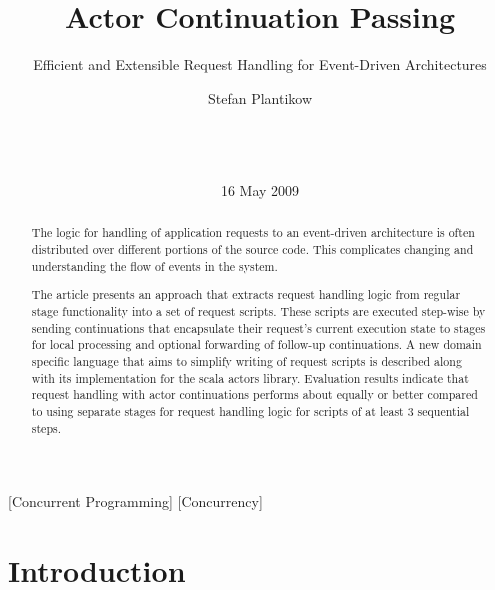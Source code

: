 \documentclass{sig-alternate}
\begin{document}

\title{Actor Continuation Passing}
\subtitle{Efficient and Extensible Request Handling for Event-Driven Architectures}


\author{
\alignauthor
Stefan Plantikow\\
       \\
       \\
       \\
}

\date{16 May 2009}


\maketitle

\begin{abstract}
The logic for handling of application requests to an event-driven architecture is often distributed
over different portions of the source code. This complicates changing and understanding the flow
of events in the system.

The article presents an approach that extracts request handling logic from regular stage
functionality into a set of request scripts. These scripts are executed step-wise by sending
continuations that encapsulate their request's current execution state to stages for local
processing and optional forwarding of follow-up continuations. A new domain specific language that
aims to simplify writing of request scripts is described along with its implementation for the scala
actors library. Evaluation results indicate that request handling with actor continuations performs
about equally or better compared to using separate stages for request handling logic for scripts of
at least 3 sequential steps.
\end{abstract}

[Concurrent Programming]         
[Concurrency]



\section{Introduction}             
\end{document}
